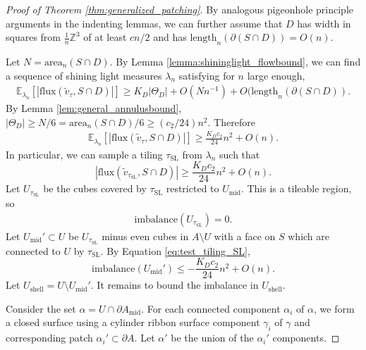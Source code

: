 \documentclass[11pt]{article}
\theoremstyle{remark}
\theoremstyle{definition}
\newcommand{\m}[1]{\mathbb{#1}}
\begin{document}
\begin{proof}[Proof of Theorem \ref{thm:generalized_patching}]
    By analogous pigeonhole principle arguments in the indenting lemmas, we can further assume that $D$ has width in squares from $\frac{1}{n} \m Z^3$ of at least $cn/2$ and has $\text{length}_n(\partial (S\cap D)) = O(n)$.
    
    Let $N = \text{area}_n(S\cap D)$. By Lemma \ref{lemma:shininglight_flowbound}, we can find a sequence of shining light measures $\lambda_n$ satisfying for $n$ large enough, 
    \begin{align*}
        \m E_{\lambda_n}[|\text{flux}(\widetilde v_\tau,S\cap D)|]\geq K_D |\Theta_D|+O(N n^{-1}) + O(\text{length}_n(\partial(S\cap D)). 
    \end{align*}
    By Lemma \ref{lem:general_annulusbound}, $|\Theta_D|\geq N/6 = \text{area}_n(S\cap D)/6\geq ( c_2 /24 ) n^2$. Therefore 
    \begin{align*}
        \m E_{\lambda_n}[|\text{flux}(\widetilde v_\tau,S\cap D)|] \geq \frac{K_D c_2}{24}n^2 + O(n).
    \end{align*}
    In particular, we can sample a tiling $\tau_{\text{SL}}$ from $\lambda_n$ such that 
    \begin{equation}\label{eq:test_tiling_SL}
        |\text{flux}(\widetilde v_{\tau_{\text{SL}}},S\cap D)| \geq \frac{K_D c_2}{24}n^2 + O(n).
    \end{equation}
    Let $U_{\tau_{\text{SL}}}$ be the cubes covered by $\tau_{\text{SL}}$ restricted to $U_{\text{mid}}$. This is a tileable region, so 
    \begin{align*}
        \text{imbalance}(U_{\tau_{\text{SL}}}) = 0. 
    \end{align*}
    Let $U_{\text{mid}}'\subset U$ be $U_{\tau_{\text{SL}}}$ minus even cubes in $A\setminus U$ with a face on $S$ which are connected to $U$ by $\tau_{\text{SL}}$. By Equation \eqref{eq:test_tiling_SL}, 
    \begin{equation}\label{eq:imbalance_mid}
        \text{imbalance}(U_{\text{mid}}') \leq -\frac{K_D c_2}{24}n^2 + O(n).
    \end{equation}
    Let $U_{\text{shell}} = U\setminus U_{\text{mid}}'$. It remains to bound the imbalance in $U_{\text{shell}}$.
    
    Consider the set $\alpha = U\cap \partial A_{\text{mid}}$. 
    For each connected component $\alpha_i$ of $\alpha$, we form a closed surface using a cylinder ribbon surface component $\gamma_i$ of $\gamma$ and corresponding patch $\alpha_i'\subset \partial A$. Let $\alpha'$ be the union of the $\alpha_i'$ components. 


\end{proof}
\end{document}
